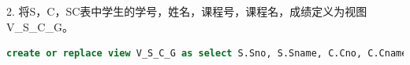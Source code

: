 \documentclass[12pt, a4paper]{report}
\begin{document}
\begin{figure}[H] %
    \centering %
\end{figure}

\begin{figure}[H] %
    \centering %
\end{figure}

\begin{figure}[H] %
    \centering %
\end{figure}

2. 将S，C，SC表中学生的学号，姓名，课程号，课程名，成绩定义为视图V\_S\_C\_G。\\

\begin{lstlisting}[language=SQL]
    create or replace view V_S_C_G as select S.Sno, S.Sname, C.Cno, C.Cname, SC.grade from S, C, SC where S.Sno = SC.Sno and C.Cno = SC.Cno;
\end{lstlisting}
\end{document}
